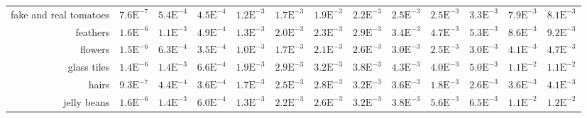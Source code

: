 \begin{landscape}
\begin{table}
\begin{tabularx}{\linewidth}{r | rr | rrrrrr | rrrr}
        fake and real tomatoes  & \footnotesize{$7.6\mathrm{E}^{-7}$}& \footnotesize{$5.4\mathrm{E}^{-4}$}& \footnotesize{$4.5\mathrm{E}^{-4}$}& \footnotesize{$1.2\mathrm{E}^{-3}$}& \footnotesize{$1.7\mathrm{E}^{-3}$}& \footnotesize{$1.9\mathrm{E}^{-3}$}& \footnotesize{$2.2\mathrm{E}^{-3}$}& \footnotesize{$2.5\mathrm{E}^{-3}$}& \footnotesize{$2.5\mathrm{E}^{-3}$}& \footnotesize{$3.3\mathrm{E}^{-3}$}& \footnotesize{$7.9\mathrm{E}^{-3}$}& \footnotesize{$8.1\mathrm{E}^{-3}$}\\
        feathers  & \footnotesize{$1.6\mathrm{E}^{-6}$}& \footnotesize{$1.1\mathrm{E}^{-3}$}& \footnotesize{$4.9\mathrm{E}^{-4}$}& \footnotesize{$1.3\mathrm{E}^{-3}$}& \footnotesize{$2.0\mathrm{E}^{-3}$}& \footnotesize{$2.3\mathrm{E}^{-3}$}& \footnotesize{$2.9\mathrm{E}^{-3}$}& \footnotesize{$3.4\mathrm{E}^{-3}$}& \footnotesize{$4.7\mathrm{E}^{-3}$}& \footnotesize{$5.3\mathrm{E}^{-3}$}& \footnotesize{$8.6\mathrm{E}^{-3}$}& \footnotesize{$9.2\mathrm{E}^{-3}$}\\
        flowers  & \footnotesize{$1.5\mathrm{E}^{-6}$}& \footnotesize{$6.3\mathrm{E}^{-4}$}& \footnotesize{$3.5\mathrm{E}^{-4}$}& \footnotesize{$1.0\mathrm{E}^{-3}$}& \footnotesize{$1.7\mathrm{E}^{-3}$}& \footnotesize{$2.1\mathrm{E}^{-3}$}& \footnotesize{$2.6\mathrm{E}^{-3}$}& \footnotesize{$3.0\mathrm{E}^{-3}$}& \footnotesize{$2.5\mathrm{E}^{-3}$}& \footnotesize{$3.0\mathrm{E}^{-3}$}& \footnotesize{$4.1\mathrm{E}^{-3}$}& \footnotesize{$4.7\mathrm{E}^{-3}$}\\
        glass tiles  & \footnotesize{$1.4\mathrm{E}^{-6}$}& \footnotesize{$1.4\mathrm{E}^{-3}$}& \footnotesize{$6.6\mathrm{E}^{-4}$}& \footnotesize{$1.9\mathrm{E}^{-3}$}& \footnotesize{$2.9\mathrm{E}^{-3}$}& \footnotesize{$3.2\mathrm{E}^{-3}$}& \footnotesize{$3.8\mathrm{E}^{-3}$}& \footnotesize{$4.3\mathrm{E}^{-3}$}& \footnotesize{$4.0\mathrm{E}^{-3}$}& \footnotesize{$5.0\mathrm{E}^{-3}$}& \footnotesize{$1.1\mathrm{E}^{-2}$}& \footnotesize{$1.1\mathrm{E}^{-2}$}\\
        hairs  & \footnotesize{$9.3\mathrm{E}^{-7}$}& \footnotesize{$4.4\mathrm{E}^{-4}$}& \footnotesize{$3.6\mathrm{E}^{-4}$}& \footnotesize{$1.7\mathrm{E}^{-3}$}& \footnotesize{$2.5\mathrm{E}^{-3}$}& \footnotesize{$2.8\mathrm{E}^{-3}$}& \footnotesize{$3.2\mathrm{E}^{-3}$}& \footnotesize{$3.6\mathrm{E}^{-3}$}& \footnotesize{$1.8\mathrm{E}^{-3}$}& \footnotesize{$2.6\mathrm{E}^{-3}$}& \footnotesize{$3.6\mathrm{E}^{-3}$}& \footnotesize{$4.1\mathrm{E}^{-3}$}\\
        jelly beans  & \footnotesize{$1.6\mathrm{E}^{-6}$}& \footnotesize{$1.4\mathrm{E}^{-3}$}& \footnotesize{$6.0\mathrm{E}^{-4}$}& \footnotesize{$1.3\mathrm{E}^{-3}$}& \footnotesize{$2.2\mathrm{E}^{-3}$}& \footnotesize{$2.6\mathrm{E}^{-3}$}& \footnotesize{$3.2\mathrm{E}^{-3}$}& \footnotesize{$3.8\mathrm{E}^{-3}$}& \footnotesize{$5.6\mathrm{E}^{-3}$}& \footnotesize{$6.5\mathrm{E}^{-3}$}& \footnotesize{$1.1\mathrm{E}^{-2}$}& \footnotesize{$1.2\mathrm{E}^{-2}$}\\

\end{tabularx}
\end{table}
\end{landscape}

